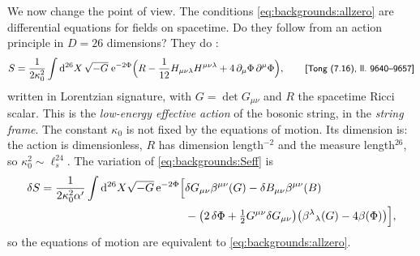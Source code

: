 We now change the point of view. The conditions \eqref{eq:backgrounds:allzero} are
differential equations for fields on spacetime. Do they follow from an action principle in
$D=26$ dimensions? They do \TL:
\begin{equation}\label{eq:backgrounds:Seff}
  S=\frac{1}{2\kappa_0^2}\int\mathrm{d}^{26}X\,\sqrt{-G}\;\mathrm{e}^{-2\Phi}
  \Bigl(R-\frac{1}{12}H_{\mu\nu\lambda}H^{\mu\nu\lambda}
  +4\,\partial_\mu\Phi\,\partial^\mu\Phi\Bigr),
  \qquad\text{{\small\textsf{[Tong (7.16), ll.~9640--9657]}}}
\end{equation}
written in Lorentzian signature, with $G=\det G_{\mu\nu}$ and $R$ the spacetime Ricci scalar.
This is the \emph{low-energy effective action} of the
bosonic string, in the \emph{string frame}. The constant $\kappa_0$ is not fixed by the
equations of motion. Its dimension is: the action is dimensionless, $R$ has dimension
length$^{-2}$ and the measure length$^{26}$, so $\kappa_0^2\sim\ell_s^{24}$.
The variation of \eqref{eq:backgrounds:Seff} is
\begin{equation}\label{eq:backgrounds:variation}
\begin{aligned}
  \delta S=\frac{1}{2\kappa_0^2\alpha'}\int\mathrm{d}^{26}X\sqrt{-G}\,\mathrm{e}^{-2\Phi}\Bigl[&
  \delta G_{\mu\nu}\beta^{\mu\nu}(G)-\delta B_{\mu\nu}\beta^{\mu\nu}(B)\\
  &-\bigl(2\,\delta\Phi+\tfrac12G^{\mu\nu}\delta G_{\mu\nu}\bigr)
  \bigl(\beta^\lambda{}_\lambda(G)-4\beta(\Phi)\bigr)\Bigr],
\end{aligned}
\end{equation}
 so the equations of motion are equivalent to
\eqref{eq:backgrounds:allzero}.

